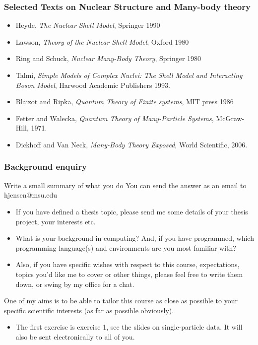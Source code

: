 \documentclass{beamer}
\begin{document}
\begin{frame}
\frametitle{Selected Texts on Nuclear Structure and Many-body theory}

\begin{block}{}
\begin{itemize}
\item Heyde, \emph{The Nuclear Shell Model}, Springer 1990

\item Lawson, \emph{Theory of the Nuclear Shell Model}, Oxford 1980

\item Ring and Schuck, \emph{Nuclear Many-Body Theory}, Springer 1980

\item Talmi, \emph{Simple Models of Complex Nuclei: The Shell Model and Interacting Boson Model}, Harwood Academic Publishers 1993.

\item Blaizot and Ripka, \emph{Quantum Theory of Finite systems}, MIT press 1986

\item Fetter and Walecka, \emph{Quantum Theory of Many-Particle Systems}, McGraw-Hill, 1971.

\item Dickhoff and Van Neck, \emph{Many-Body Theory Exposed}, World Scientific, 2006.
\end{itemize}

\noindent
\end{block}
\end{frame}

\begin{frame}
\frametitle{Background enquiry}

\begin{block}{Write a small summary of what you do }
You can send the answer as an email to hjensen@msu.edu
\begin{itemize}
\item If you have defined a thesis topic, please send me some details of your thesis project, your interests etc.

\item What is your background in computing? And, if you have programmed, which programming language(s) and environments  are you  most familiar with?  

\item Also, if you have specific wishes with respect to this course, expectations, topics you'd like me to cover or other things, please feel free to write them down, or swing by my office for a chat. 
\end{itemize}

\noindent
One of my aims is to be able to tailor this course as close as possible to your specific scientific interests (as far as possible obviously).

\begin{itemize}
\item The first exercise is exercise 1, see the slides on single-particle data.  It will also be sent electronically to all of you.
\end{itemize}

\noindent
\end{block}
\end{frame}
\end{document}
